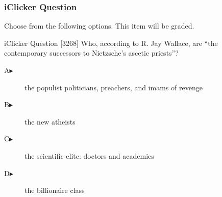 \begin{frame}
  \frametitle{iClicker Question}
Choose from the following options. This item will be graded.
\begin{block}{iClicker Question}
[3268] Who, according to R. Jay Wallace, are ``the contemporary successors to Nietzsche's ascetic priests''?
\end{block}
\begin{description}
\item[A\hspace{.2in}$\blacktriangleright$] the populist politicians, preachers, and imams of revenge
\item[B\hspace{.2in}$\blacktriangleright$] the new atheists
\item[C\hspace{.2in}$\blacktriangleright$] the scientific elite: doctors and academics
\item[D\hspace{.2in}$\blacktriangleright$] the billionaire class
\end{description}
\end{frame}